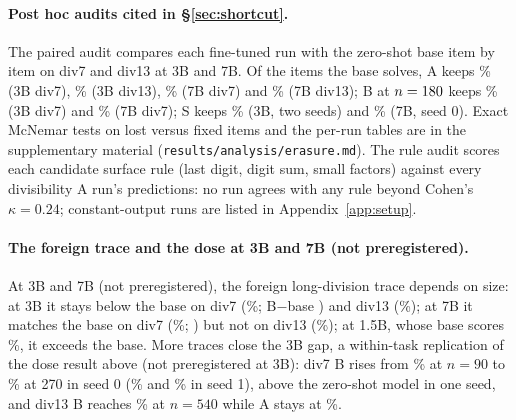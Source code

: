\documentclass{article}
\theoremstyle{definition}
\begin{document}
\paragraph{Post hoc audits cited in \S\ref{sec:shortcut}.} The paired audit compares each fine-tuned run with the zero-shot base item by item on div7 and div13 at 3B and 7B. Of the items the base solves, A keeps \erThreeBdivsevenAkeep\% (3B div7), \erThreeBdivthirteenAkeep\% (3B div13), \erSevenBdivsevenAkeep\% (7B div7) and \erSevenBdivthirteenAkeep\% (7B div13); B at $n=180$ keeps \erThreeBdivsevenBkeep\% (3B div7) and \erSevenBdivsevenBkeep\% (7B div7); S keeps \erThreeBdivsevenSkeep\% (3B, two seeds) and \erSevenBdivsevenSkeep\% (7B, seed 0). Exact McNemar tests on lost versus fixed items and the per-run tables are in the supplementary material (\texttt{results/analysis/erasure.md}). The rule audit scores each candidate surface rule (last digit, digit sum, small factors) against every divisibility A run's predictions: no run agrees with any rule beyond Cohen's $\kappa=0.24$; constant-output runs are listed in Appendix~\ref{app:setup}.

\paragraph{The foreign trace and the dose at 3B and 7B (not preregistered).} At 3B and 7B (not preregistered), the foreign long-division trace depends on size: at 3B it stays below the base on div7 (\threeBdivsevenB\%; B$-$base \threeBdivsevenBootBBaseDiff{} \threeBdivsevenBootBBaseCi) and div13 (\threeBdivthirteenB\%); at 7B it matches the base on div7 (\sevenBdivsevenB\%; \sevenBdivsevenBootBBaseDiff{} \sevenBdivsevenBootBBaseCi) but not on div13 (\sevenBdivthirteenB\%); at 1.5B, whose base scores \divsevenBase\%, it exceeds the base. More traces close the 3B gap, a within-task replication of the dose result above (not preregistered at 3B): div7 B rises from \threeBdivsevenBnNinetysZero\% at $n=90$ to \threeBdivsevenBnTwoSeventysZero\% at 270 in seed 0 (\threeBdivsevenBnNinetysOne\% and \threeBdivsevenBnTwoSeventysOne\% in seed 1), above the zero-shot model in one seed, and div13 B reaches \threeBdivthirteenBnFiveForty\% at $n=540$ while A stays at \threeBdivthirteenAnFiveForty\%.
\end{document}
